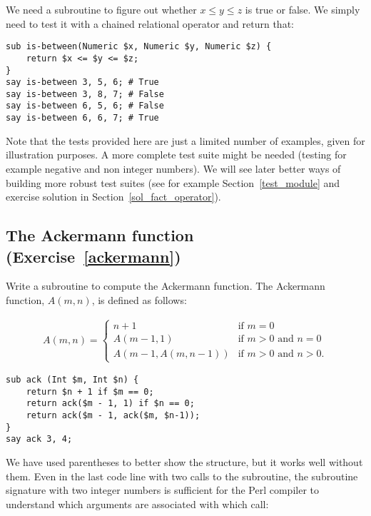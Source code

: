 We need a subroutine to figure out whether $x \le y \le z$ 
is true or false. We simply need to test it with a chained relational operator and return that:

\begin{verbatim}
sub is-between(Numeric $x, Numeric $y, Numeric $z) {
    return $x <= $y <= $z;
}
say is-between 3, 5, 6; # True
say is-between 3, 8, 7; # False
say is-between 6, 5, 6; # False
say is-between 6, 6, 7; # True
\end{verbatim}
%

Note that the tests provided here are just a limited number of 
examples, given for illustration purposes. A more complete test 
suite might be needed (testing for example negative and non 
integer numbers). We will see later better ways 
of building more robust test suites (see for example 
Section~\ref{test_module} and exercise 
solution in Section~\ref{sol_fact_operator}).


\subsection{The Ackermann function (Exercise~\ref{ackermann})}
\label{sol_ackermann}

Write a subroutine to compute the Ackermann function. The Ackermann function, $A(m, n)$, is defined as follows:

\begin{eqnarray*}
A(m, n) = \begin{cases} 
              n+1 & \mbox{if } m = 0 \\ 
        A(m-1, 1) & \mbox{if } m > 0 \mbox{ and } n = 0 \\ 
A(m-1, A(m, n-1)) & \mbox{if } m > 0 \mbox{ and } n > 0.
\end{cases} 
\end{eqnarray*}
%

\begin{verbatim}
sub ack (Int $m, Int $n) {
    return $n + 1 if $m == 0;
    return ack($m - 1, 1) if $n == 0;
    return ack($m - 1, ack($m, $n-1));
}
say ack 3, 4;
\end{verbatim}

We have used parentheses to better show the structure, but 
it works well without them. Even in the last code line with
two calls to the subroutine, the subroutine signature with 
two integer numbers is sufficient for the Perl compiler 
to understand which arguments are associated with which call:

